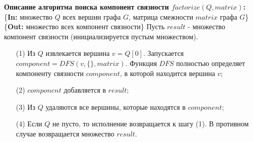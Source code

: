 \documentclass[a4paper,20pt]{article}
\numberwithin{equation}{subsubsection}
\numberwithin{definition}{subsubsection}
\begin{document}
	\noindent\textbf{Описание алгоритма поиска компонент связности $factorize(Q, matrix)$:}
	\newline
	\{\textbf{In:} множество $Q$ всех вершин графа $G$, матрица смежности $matrix$ графа $G$\}
	\newline
	\{\textbf{Out:} множество всех компонент связности\}
	\newline
	Пусть $result$ - множество компонент связности (инициализируется пустым множеством).
	\begin{enumerate}
		\item[(1)] Из $Q$ извлекается вершина $v = Q[0]$. Запускается $component = DFS(v, \{\}, matrix)$. Функция $DFS$ полностью определяет компоненту связности $component$, в которой находится вершина $v$;
		\item[(2)] $component$ добавляется в $result$;
		\item[(3)] Из $Q$ удаляются все вершины, которые находятся в $component$;
		\item[(4)] Если $Q$ не пусто, то исполнение возвращается к шагу (1). В противном случае возвращается множество $result$.
	\end{enumerate}
	
\end{document}
